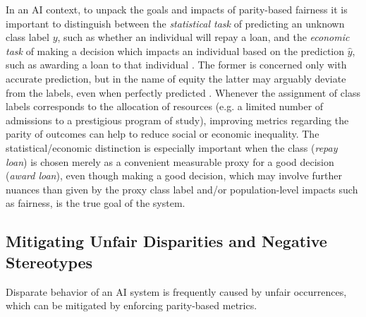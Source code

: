 \documentclass[11pt,dvipdfm]{article}
\begin{document}
In an AI context, to unpack the goals and impacts of parity-based fairness it is important to distinguish between the \emph{statistical task} of predicting an unknown class label $y$, such as whether an individual will repay a loan, and the \emph{economic task} of making a decision which impacts an individual based on the prediction $\hat{y}$, such as awarding a loan to that individual \cite{corbettdavies2018measure}.  The former is concerned only with accurate prediction, but in the name of equity the latter may arguably deviate from the labels, even when perfectly predicted \cite{foulds2020intersectional}.  Whenever the assignment of class labels corresponds to the allocation of resources (e.g. a limited number of admissions to a prestigious program of study), improving metrics regarding the parity of outcomes can help to reduce social or economic inequality.  The statistical/economic distinction is especially important when the class (\emph{repay loan}) is chosen merely as a convenient measurable proxy for a good decision (\emph{award loan}), even though making a good decision, which may involve further nuances than given by the proxy class label and/or population-level impacts such as fairness, is the true goal of the system.

\subsection{Mitigating Unfair Disparities and Negative Stereotypes}
Disparate behavior of an AI system is frequently caused by unfair occurrences, which can be mitigated by enforcing parity-based metrics. 
\end{document}

